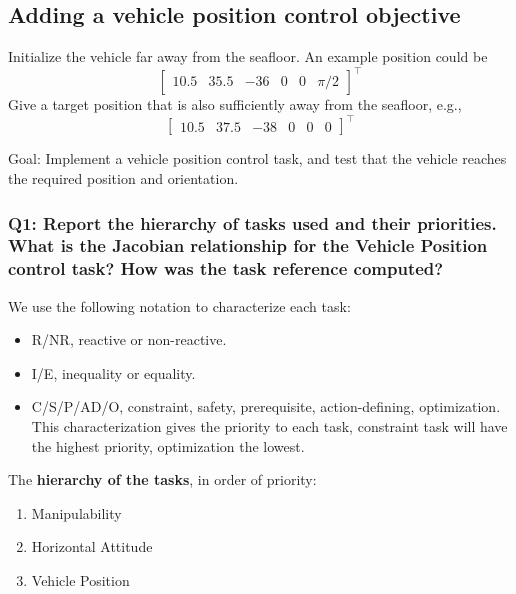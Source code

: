 \documentclass{article}
\begin{document}
\subsection{Adding a vehicle position control objective}
Initialize the vehicle far away from the seafloor. An example position could be
\begin{displaymath}
\begin{bmatrix} 10.5 & 35.5 & -36 & 0 & 0 & \pi/2\end{bmatrix}^\top
\end{displaymath} 
Give a target position that is also sufficiently away from the seafloor, e.g.,
\begin{displaymath}
\begin{bmatrix} 10.5 & 37.5 & -38 & 0 & 0 & 0 \end{bmatrix}^\top
\end{displaymath}

Goal: Implement a vehicle position control task, and test that the vehicle reaches the required position and orientation.



\subsubsection{Q1: Report the hierarchy of tasks used and their priorities. What is the Jacobian relationship for the Vehicle Position control task? How was the task reference computed?}

We use the following notation to characterize each task:
\begin{itemize}
    \item R/NR, reactive or non-reactive.
    \item I/E, inequality or equality.
    \item C/S/P/AD/O, constraint, safety, prerequisite, action-defining, optimization. This characterization gives the priority to each task, constraint task will have the highest priority, optimization the lowest.
\end{itemize}

\noindent
\vspace{5px}
The \textbf{hierarchy of the tasks}, in order of priority:
\begin{enumerate}
    \item Manipulability 
    \item Horizontal Attitude
    \item Vehicle Position
\end{enumerate}
\end{document}
